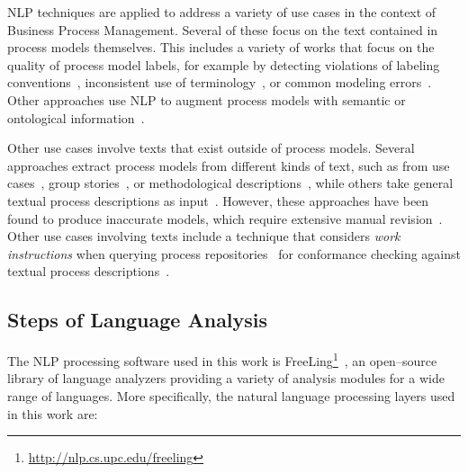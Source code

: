 NLP techniques are applied to address a variety of use cases in the context of
Business Process Management. Several of these focus on the text contained in
process models themselves. This includes a variety of works that focus on the
quality of process model labels, for example by detecting violations of labeling
conventions~\cite{becker2009,leopold2013detection,vandervos1997verification},
inconsistent use of terminology~\cite{koschmider2007}, or common modeling
errors~\cite{gruhn2011detecting}. Other approaches use NLP to augment process
models with semantic or ontological
information~\cite{leopold2015towards,francescomarino2009supporting,born2007userfriendly}.

Other use cases involve texts that exist outside of process models. Several
approaches extract process models from different kinds of text, such as from use
cases~\cite{sinha2010use}, group stories~\cite{gonccalves2009business}, or
methodological descriptions~\cite{epure2015automatic},  while others take
general textual process descriptions as
input~\cite{ghose2007process,friedrich2011process}. However,  these approaches
have been found to produce inaccurate models, which require extensive manual
revision~\cite{selway2015formalising}. Other use cases involving texts include a
technique that considers \textit{work instructions} when querying process
repositories~\cite{leopold2017searching} for conformance checking against
textual process descriptions~\cite{vanderaa2018checking}.


\subsection{Steps of Language Analysis}

 The NLP processing software used in this work is
 FreeLing\footnote{\url{http://nlp.cs.upc.edu/freeling}}~\cite{PadroS12}, an
 open--source library of language analyzers providing a variety of analysis
 modules for a wide range of languages. More specifically, the natural language
 processing layers used in this work are:
 
